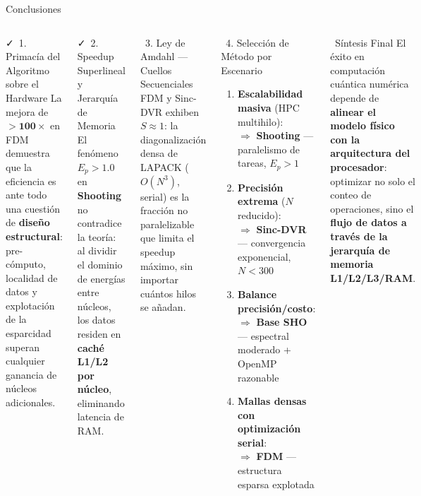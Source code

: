 \documentclass[aspectratio=169,10pt]{beamer}
\begin{document}
\begin{frame}{Conclusiones}
\begin{columns}[T]
\begin{successbox}{\faCheck\ 1. Primacía del Algoritmo sobre el Hardware}
La mejora de $\mathbf{>100\times}$ en FDM demuestra que la eficiencia es ante todo una cuestión de \textbf{diseño estructural}: pre-cómputo, localidad de datos y explotación de la esparcidad superan cualquier ganancia de núcleos adicionales.
\end{successbox}
\vspace{0.27cm}
\begin{successbox}{\faCheck\ 2. Speedup Superlineal y Jerarquía de Memoria}
El fenómeno $E_p > 1.0$ en \textbf{Shooting} no contradice la teoría: al dividir el dominio de energías entre núcleos, los datos residen en \textbf{caché L1/L2 por núcleo}, eliminando latencia de RAM.
\end{successbox}
\vspace{0.27cm}
\begin{alertbox}{\faExclamationTriangle\ 3. Ley de Amdahl — Cuellos Secuenciales}
FDM y Sinc-DVR exhiben $S \approx 1$: la diagonalización densa de LAPACK ($O(N^3)$, serial) es la fracción no paralelizable que limita el speedup máximo, sin importar cuántos hilos se añadan.
\end{alertbox}

\begin{physbox}{\faBook\ 4. Selección de Método por Escenario}
\begin{enumerate}\setlength\itemsep{4pt}
  \item \textbf{Escalabilidad masiva} (HPC multihilo):\\
  \hspace{1em}$\Rightarrow$ \textbf{Shooting} — paralelismo de tareas, $E_p>1$
  \item \textbf{Precisión extrema} ($N$ reducido):\\
  \hspace{1em}$\Rightarrow$ \textbf{Sinc-DVR} — convergencia exponencial, $N<300$
  \item \textbf{Balance precisión/costo}:\\
  \hspace{1em}$\Rightarrow$ \textbf{Base SHO} — espectral moderado + OpenMP razonable
  \item \textbf{Mallas densas con optimización serial}:\\
  \hspace{1em}$\Rightarrow$ \textbf{FDM} — estructura esparsa explotada
\end{enumerate}
\end{physbox}
\vspace{0.225cm}
\begin{conclusionbox}{\faStar\ Síntesis Final}
El éxito en computación cuántica numérica depende de \textbf{alinear el modelo físico con la arquitectura del procesador}: optimizar no solo el conteo de operaciones, sino el \textbf{flujo de datos a través de la jerarquía de memoria L1/L2/L3/RAM}.
\end{conclusionbox}
\end{columns}
\end{frame}
\end{document}
